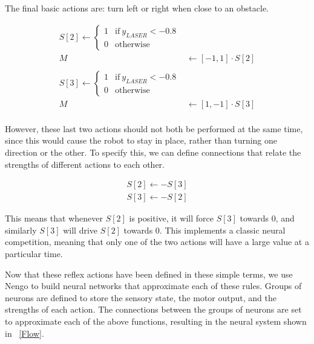\documentclass{frontiersSCNS}
\begin{document}
The final basic actions are: turn left or right when close to an obstacle. 

\begin{equation}
    \begin{split}
    S[2] \leftarrow \left \{ \begin{array}{ll}
            1 & \text{if}~y_{LASER} < -0.8 \\
               0 & \text{otherwise}
    \end{array} \right. \\
       M & \leftarrow [-1, 1] \cdot S[2] \\ 
       \\
    S[3] \leftarrow \left \{ \begin{array}{ll}
            1 & \text{if}~y_{LASER} < -0.8 \\
               0 & \text{otherwise}
    \end{array} \right. \\
       M & \leftarrow [1, -1] \cdot S[3] \\
    \end{split}
\end{equation}

However, these last two actions should not both be performed at the same time,
since this would cause the robot to stay in place, rather than turning one
direction or the other. To specify this, we can define connections that relate 
the strengths of different actions to each other.

\begin{equation}
    \begin{split}
       S[2] \leftarrow -S[3] \\
       S[3] \leftarrow -S[2]
    \end{split}
\end{equation}

This means that whenever $S[2]$ is positive, it will force $S[3]$ towards $0$, 
and similarly $S[3]$ will drive $S[2]$ towards $0$.  This implements a classic
neural competition, meaning that only one of the two actions will have a large
value at a particular time.

Now that these reflex actions have been defined in these simple terms, we use
Nengo to build neural networks that approximate each of these rules.  Groups
of neurons are defined to store the sensory state, the motor output, and the 
strengths of each action. The connections between the groups of neurons are 
set to approximate each of the above functions, resulting in the neural 
system shown in \figurename~\ref{Flow}. 
\end{document}
